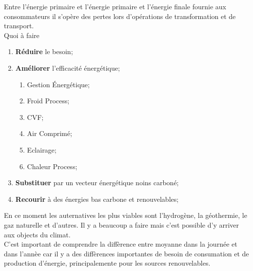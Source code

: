 \documentclass{article}
\begin{document}
\noindent Entre l'énergie primaire et l'énergie primaire et l'énergie finale fournie aux consommateurs il s'opère des pertes lors d'opérations de transformation et de transport.\\

\noindent Quoi à faire
\begin{enumerate}
    \item \textbf{Réduire} le besoin;
    \item \textbf{Améliorer} l'efficacité énergétique;
    \begin{enumerate}[noitemsep]
        \item Gestion Énergétique;
        \item Froid Process;

        \item CVF;
        \item Air Comprimé;

        \item Eclairage;

        \item Chaleur Process;
    \end{enumerate}
    \item \textbf{Substituer} par un vecteur énergétique noins carboné;
    \item \textbf{Recourir} à des énergies bas carbone et renouvelables;
\end{enumerate}
En ce moment les auternatives les plus viables sont l'hydrogène, la géothermie, le gaz naturelle et d'autres. Il y a beaucoup a faire mais c'est possible d'y arriver aux objects du climat.\\

\noindent C'est important de comprendre la diffèrence entre moyanne dans la journée et dans l'annèe car il y a des diffèrences importantes de besoin de consumation et de production d'énergie, principalemente pour les sources renouvelables.
\end{document}
